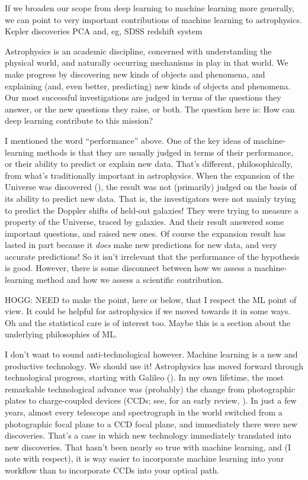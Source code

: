 \documentclass[11pt]{article}
\begin{document}
If we broaden our scope from deep learning to machine learning more generally, we can point to very important contributions of machine learning to astrophysics.
Kepler discoveries
PCA and, eg, SDSS redshift system

Astrophysics is an academic discipline, concerned with understanding the physical world, and naturally occurring mechanisms in play in that world.
We make progress by discovering new kinds of objects and phenomena, and explaining (and, even better, predicting) new kinds of objects and phenomena.
Our most successful investigations are judged in terms of the questions they answer, or the new questions they raise, or both.
The question here is: How can deep learning contribute to this mission?

I mentioned the word ``performance'' above.
One of the key ideas of machine-learning methods is that they are usually judged in terms of their performance, or their ability to predict or explain new data.
That's different, philosophically, from what's traditionally important in astrophysics.
When the expansion of the Universe was discovered (\cite{expansion, expansion2}), the result was not (primarily) judged on the basis of its ability to predict new data.
That is, the investigators were not mainly trying to predict the Doppler shifts of held-out galaxies!
They were trying to measure a property of the Universe, traced by galaxies.
And their result answered some important questions, and raised new ones.
Of course the expansion result has lasted in part because it \emph{does} make new predictions for new data, and very accurate predictions!
So it isn't irrelevant that the performance of the hypothesis is good.
However, there is some disconnect between how we assess a machine-learning method and how we assess a scientific contribution.

HOGG: NEED to make the point, here or below, that I respect the ML point of view. It could be helpful for astrophysics if we moved towards it in some ways. Oh and the statistical care is of interest too. Maybe this is a section about the underlying philosophies of ML.

I don't want to sound anti-technological however.
Machine learning is a new and productive technology.
We should use it!
Astrophysics has moved forward through technological progress, starting with Galileo (\cite{galileo}).
In my own lifetime, the most remarkable technological advance was (probably) the change from photographic plates to charge-coupled devices (CCDs; see, for an early review, \cite{ccd}).
In just a few years, almost every telescope and spectrograph in the world switched from a photographic focal plane to a CCD focal plane, and immediately there were new discoveries.
That's a case in which new technology immediately translated into new discoveries.
That hasn't been nearly so true with machine learning, and (I note with respect), it is way easier to incorporate machine learning into your workflow than to incorporate CCDs into your optical path.
\end{document}
